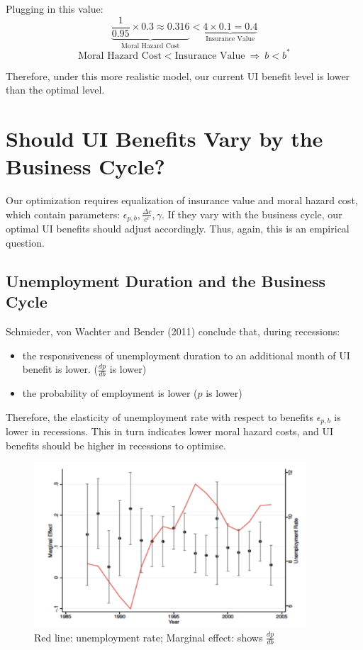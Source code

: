         Plugging in this value:
        $$\underbrace{\frac{1}{0.95}\times{0.3} \approx 0.316}_{\text{Moral\ Hazard\ Cost}} < \underbrace{4 \times 0.1 = 0.4}_{\text{Insurance\ Value}}$$
        $$\text{Moral\ Hazard\ Cost} < \text{Insurance\ Value}\ \Rightarrow\ b<b^*$$
        
        Therefore, under this more realistic model, our current UI benefit level is lower than the optimal level.
    
\section{Should UI Benefits Vary by the Business Cycle?}
    Our optimization requires equalization of insurance value and moral hazard cost, which contain parameters: $\epsilon_{p,b}, \frac{\Delta c}{c^e}, \gamma$. If they vary with the business cycle, our optimal UI benefits should adjust accordingly. Thus, again, this is an empirical question.
    
    \subsection{Unemployment Duration and the Business Cycle}
        Schmieder, von Wachter and Bender (2011) conclude that, during recessions:
        \begin{itemize}
            \item the responsiveness of unemployment duration to an additional month of UI benefit is lower. ($\frac{dp}{db}$ is lower)
            \item the probability of employment is lower ($p$ is lower) 
        \end{itemize}
        Therefore, the elasticity of unemployment rate with respect to benefits $\epsilon_{p,b}$ is lower in recessions. This in turn indicates lower moral hazard costs, and UI benefits should be higher in recessions to optimise.
        \begin{figure}[H]
            \centering
            \includegraphics[width=4in]{images/ch1/Schmieder.png}
            \caption{Red line: unemployment rate; Marginal effect: shows $\frac{dp}{db}$}
        \end{figure}
        
